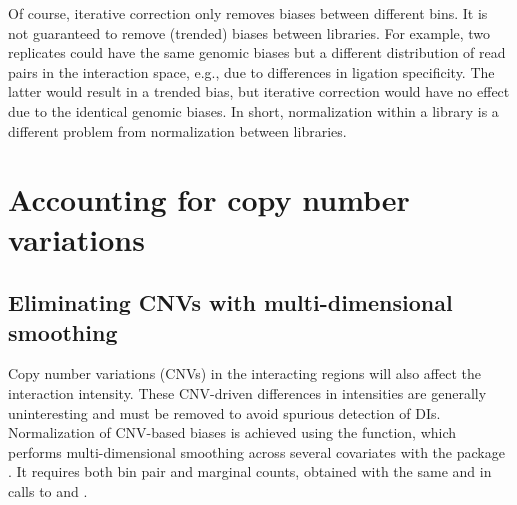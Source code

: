 \documentclass{report}\usepackage[]{graphicx}\usepackage[usenames,dvipsnames]{color}
\newcommand{\hlnum}[1]{\textcolor[rgb]{0.816,0.125,0.439}{#1}}%
\newcommand{\hlstr}[1]{\textcolor[rgb]{0.251,0.627,0.251}{#1}}%
\newcommand{\hlopt}[1]{\textcolor[rgb]{0,0,0}{#1}}%
\newcommand{\hlstd}[1]{\textcolor[rgb]{0.251,0.251,0.251}{#1}}%
\newcommand{\hlkwb}[1]{\textcolor[rgb]{0,0,0}{#1}}%
\newcommand{\hlkwc}[1]{\textcolor[rgb]{0.251,0.251,0.251}{#1}}%
\newcommand{\hlkwd}[1]{\textcolor[rgb]{0.878,0.439,0.125}{#1}}%
\newenvironment{knitrout}{}{} %
\begin{document}
\begin{knitrout}
\color{fgcolor}
\end{knitrout}

Of course, iterative correction only removes biases between different bins.
It is not guaranteed to remove (trended) biases between libraries.
For example, two replicates could have the same genomic biases but a different distribution of read pairs in the interaction space, e.g., due to differences in ligation specificity.
The latter would result in a trended bias, but iterative correction would have no effect due to the identical genomic biases.
In short, normalization within a library is a different problem from normalization between libraries.

\section{Accounting for copy number variations}
\label{sec:copy}

\subsection{Eliminating CNVs with multi-dimensional smoothing}
Copy number variations (CNVs) in the interacting regions will also affect the interaction intensity. 
These CNV-driven differences in intensities are generally uninteresting and must be removed to avoid spurious detection of DIs.
Normalization of CNV-based biases is achieved using the  function, which performs  multi-dimensional smoothing across several covariates with the  package \cite{loader1999local}.
It requires both bin pair and marginal counts, obtained with the same  and  in calls to  and .
\end{document}
